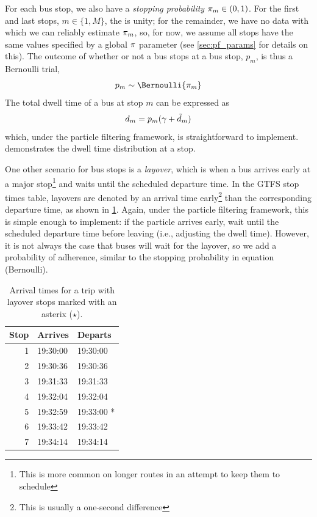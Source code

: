 For each bus stop, we also have a \emph{stopping probability} $\pi_m\in(0,1)$. For the first and last stops, $m\in\{1,M\}$, the is unity; for the remainder, we have no data with which we can reliably estimate $\pi_m$, so, for now, we assume all stops have the same values specified by a global $\pi$ parameter (see \cref{sec:pf_params} for details on this). The outcome of whether or not a bus stops at a bus stop, $p_m$, is thus a Bernoulli trial,
\begin{equation}
\label{eq:stop_pstop}
\Istop_m \sim \Bernoulli{\Prstop_m}
\end{equation}
The total dwell time of a bus at stop $m$ can be expressed as
\begin{equation}
\label{eq:stop_total_dwell_time}
d_m = p_m (\gamma + \tilde d_m)
\end{equation}
which, under the particle filtering framework, is straightforward to implement.  demonstrates the dwell time distribution at a stop.

One other scenario for bus stops is a \emph{layover}, which is when a bus arrives early at a major stop\footnote{This is more common on longer routes in an attempt to keep them to schedule} and waits until the scheduled departure time. In the GTFS stop times table, layovers are denoted by an arrival time early\footnote{This is usually a one-second difference} than the corresponding departure time, as shown in \cref{tab:layover_times}. Again, under the particle filtering framework, this is simple enough to implement: if the particle arrives early, wait until the scheduled departure time before leaving (i.e., adjusting the dwell time). However, it is not always the case that buses will wait for the layover, so we add a probability of adherence, similar to the stopping probability in equation (Bernoulli).

\begin{knitrout}
\color{fgcolor}\begin{table}

\caption{\label{tab:layover_times}Arrival times for a trip with layover stops marked with an asterix ($\star$).}
\centering
\begin{tabular}[t]{rll}
\toprule
Stop & Arrives & Departs\\
\midrule
1 & 19:30:00 & 19:30:00\\
2 & 19:30:36 & 19:30:36\\
3 & 19:31:33 & 19:31:33\\
4 & 19:32:04 & 19:32:04\\
5 & 19:32:59 & 19:33:00 *\\
6 & 19:33:42 & 19:33:42\\
7 & 19:34:14 & 19:34:14\\
\bottomrule
\end{tabular}
\end{table}


\end{knitrout}


